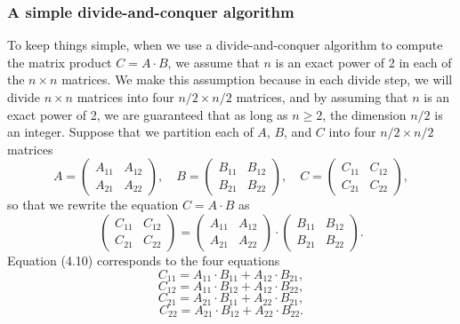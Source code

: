 \documentclass{report}
\begin{document}
        \subsubsection{A simple divide-and-conquer algorithm}
        \bigbreak \noindent 
        To keep things simple, when we use a divide-and-conquer algorithm to compute
        the matrix product $C = A \cdot B$, we assume that $n$ is an exact power of 2 in each of
        the $n \times n$ matrices. We make this assumption because in each divide step, we will
        divide $n \times n$ matrices into four $n/2 \times n/2$ matrices, and by assuming that $n$ is an
        exact power of 2, we are guaranteed that as long as $n \geq 2$, the dimension $n/2$ is an
        integer.
        \bigbreak \noindent 
        Suppose that we partition each of $A$, $B$, and $C$ into four $n/2 \times n/2$ matrices
        \[
            A = \begin{pmatrix} A_{11} & A_{12} \\ A_{21} & A_{22} \end{pmatrix}, \quad
            B = \begin{pmatrix} B_{11} & B_{12} \\ B_{21} & B_{22} \end{pmatrix}, \quad
            C = \begin{pmatrix} C_{11} & C_{12} \\ C_{21} & C_{22} \end{pmatrix}, \tag{4.9}
        \]
        so that we rewrite the equation $C = A \cdot B$ as
        \[
            \begin{pmatrix} C_{11} & C_{12} \\ C_{21} & C_{22} \end{pmatrix} =
            \begin{pmatrix} A_{11} & A_{12} \\ A_{21} & A_{22} \end{pmatrix} \cdot
            \begin{pmatrix} B_{11} & B_{12} \\ B_{21} & B_{22} \end{pmatrix}. \tag{4.10}
        \]
        Equation (4.10) corresponds to the four equations
        \[
            C_{11} = A_{11} \cdot B_{11} + A_{12} \cdot B_{21}, \tag{4.11}
        \]
        \[
            C_{12} = A_{11} \cdot B_{12} + A_{12} \cdot B_{22}, \tag{4.12}
        \]
        \[
            C_{21} = A_{21} \cdot B_{11} + A_{22} \cdot B_{21}, \tag{4.13}
        \]
        \[
            C_{22} = A_{21} \cdot B_{12} + A_{22} \cdot B_{22}. \tag{4.14}
        \]
\end{document}
